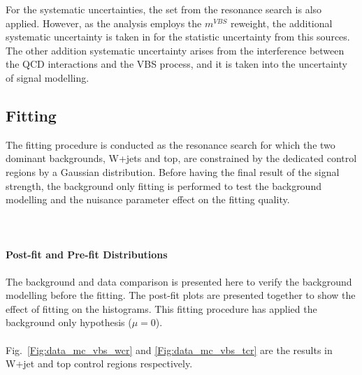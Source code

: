 For the systematic uncertainties, the set from the resonance search is also applied. However, as the analysis employs the $m^{VBS}$ reweight, the additional systematic uncertainty is taken in for the statistic uncertainty from this sources. The other addition systematic uncertainty arises from the interference between the QCD interactions and the VBS process, and it is taken into the uncertainty of signal modelling. 

\subsection{Fitting}
The fitting procedure is conducted as the resonance search for which the two dominant backgrounds, W+jets and top, are constrained by the dedicated control regions by a Gaussian distribution. Before having the final result of the signal strength, the background only fitting is performed to test the background modelling and the nuisance parameter effect on the fitting quality.
\\
\\
\\
\\{\bf Post-fit and Pre-fit Distributions} 
\\
\\The background and data comparison is presented here to verify the background modelling before the fitting. The post-fit plots are presented together to show the effect of fitting on the histograms. This fitting procedure has applied the background only hypothesis ($\mu=0$).
\\
\\Fig.~\ref{Fig:data_mc_vbs_wcr} and \ref{Fig:data_mc_vbs_tcr} are the results in W+jet and top control regions respectively. 
